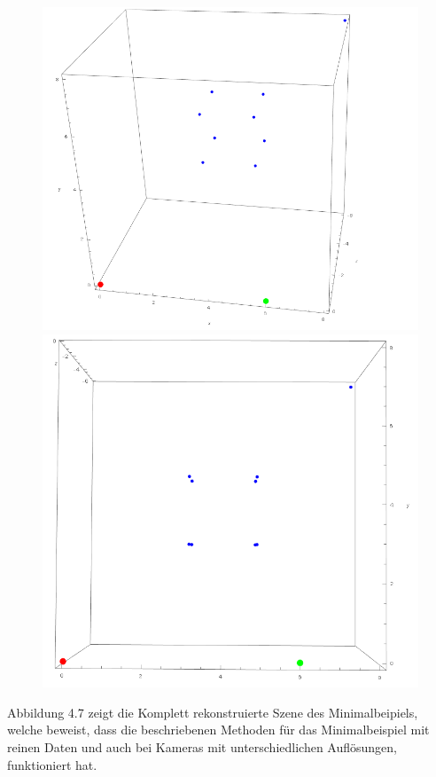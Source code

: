 \begin{figure}[!htb]
	\includegraphics[width=\linewidth]{images/MinimalBeispiel_reconstructed.png}
	\label{fig:awesome_image1}
	\endminipage\hfill
	\includegraphics[width=\linewidth]{images/MinimalBeispiel_reconstructed_3.png}
	\label{fig:awesome_image2}
	\endminipage\hfill
\end{figure}

\pagebreak
Abbildung 4.7 zeigt die Komplett rekonstruierte Szene des Minimalbeipiels, welche beweist, dass die beschriebenen Methoden für das Minimalbeispiel mit reinen Daten und auch bei Kameras mit unterschiedlichen Auflösungen, funktioniert hat. 

